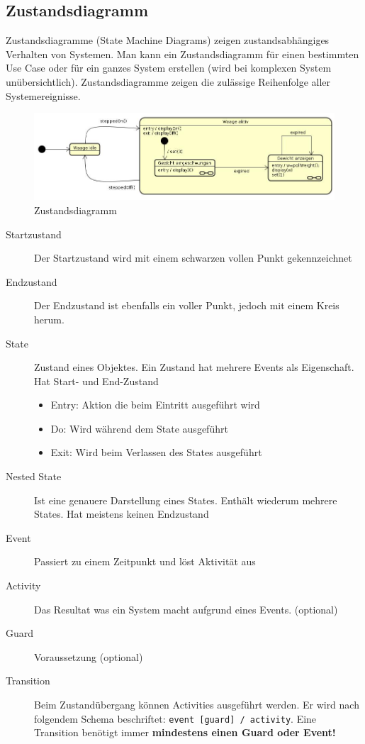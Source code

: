 \subsection{Zustandsdiagramm}
Zustandsdiagramme (State Machine Diagrams) zeigen zustandsabhängiges Verhalten von Systemen. Man kann ein Zustandsdiagramm für einen bestimmten Use Case oder für ein ganzes System erstellen (wird bei komplexen System unübersichtlich). Zustandsdiagramme zeigen die zulässige Reihenfolge aller Systemereignisse.
\begin{figure}[h]
\centering
\includegraphics[width=0.7\linewidth]{images/state_machine_diagram}
\caption{Zustandsdiagramm}
\label{fig:statemachinediagram}
\end{figure}

\begin{description}
	\item[Startzustand] Der Startzustand wird mit einem schwarzen vollen Punkt gekennzeichnet
	\item[Endzustand] Der Endzustand ist ebenfalls ein voller Punkt, jedoch mit einem Kreis herum.
	\item[State] Zustand eines Objektes. Ein Zustand hat mehrere Events als Eigenschaft. Hat Start- und End-Zustand
	\begin{itemize}
		\item Entry: Aktion die beim Eintritt ausgeführt wird
		\item Do: Wird während dem State ausgeführt
		\item Exit: Wird beim Verlassen des States ausgeführt
	\end{itemize}
	\item[Nested State] Ist eine genauere Darstellung eines States. Enthält wiederum mehrere States. Hat meistens keinen Endzustand
	\item[Event] Passiert zu einem Zeitpunkt und löst Aktivität aus
	\item[Activity] Das Resultat was ein System macht aufgrund eines Events. (optional)
	\item[Guard] Voraussetzung (optional)
	\item[Transition] Beim Zustandübergang können Activities ausgeführt werden. Er wird nach folgendem Schema beschriftet: \lstinline|event [guard] / activity|. Eine Transition benötigt immer \textbf{mindestens einen Guard oder Event!}
\end{description}

